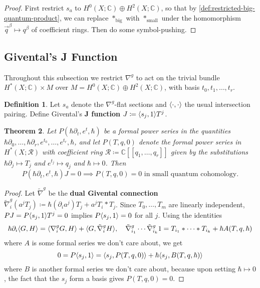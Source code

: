 \documentclass{report}
\theoremstyle{plain}
\newtheorem{theorem}{Theorem}[section]
\theoremstyle{definition}
\newtheorem{definition}[theorem]{Definition}
\theoremstyle{remark}
\newcommand{\di}{\partial}
\newcommand{\bC}{\mathbb{C}}
\newcommand{\cR}{\mathcal{R}}
\DeclarePairedDelimiter{\inner}{\langle}{\rangle}
\begin{document}
\begin{proof}
  First restrict $s_a$ to $H^0(X; \bC) \oplus H^2(X; \bC)$, so that by
  \ref{def:restricted-big-quantum-product}, we can replace
  $*_{\text{big}}$ with $*_{\text{small}}$ under the homomorphism
  $\vec q^\beta \mapsto q^\beta$ of coefficient rings. Then do some
  symbol-pushing.
\end{proof}

\subsection{Givental's J Function}

Throughout this subsection we restrict $\nabla^g$ to act on the
trivial bundle $H^*(X; \bC) \times M$ over $M = H^0(X; \bC) \oplus
H^2(X; \bC)$, with basis $t_0, t_1, \ldots, t_r$.

\begin{definition}
  Let $s_a$ denote the $\nabla^g$-flat sections and $\inner{\cdot,
    \cdot}$ the usual intersection pairing. Define Givental's {\bf J
    function} $J \coloneqq \inner{s_j, 1}T^j$.
\end{definition}

\begin{theorem}
  Let $P(\hbar \di_t, e^t, \hbar)$ be a formal power series in the
  quantities $\hbar \di_0, \ldots, \hbar \di_r, e^{t_0}, \ldots,
  e^{t_r}, \hbar$, and let $P(T,q,0)$ denote the formal power series
  in $H^*(X; \cR)$ with coefficient ring $\cR \coloneqq \bC[[q_1,
      \ldots, q_r]]$ given by the substitutions $\hbar \di_j \mapsto
  T_j$ and $e^{t_j} \mapsto q_j$ and $\hbar \mapsto 0$. Then
  \[ P(\hbar \di_t, e^t, \hbar)J = 0 \implies P(T, q, 0) = 0 \text{ in small quantum cohomology}. \]
\end{theorem}

\begin{proof}
  Let $\tilde\nabla^g$ be the {\bf dual Givental connection}
  $\tilde\nabla^g_i(a^jT_j) \coloneqq \hbar (\di_i a^j)T_j + a^j T_i *
  T_j$. Since $T_0, \ldots, T_m$ are linearly independent, $PJ =
  P\inner{s_j, 1}T^j = 0$ implies $P\inner{s_j, 1} = 0$ for all $j$.
  Using the identities
  \[ \hbar \di_i \inner{G, H} = \inner{\nabla^g_i G, H} + \inner{G, \tilde\nabla^g_i H}, \quad \tilde\nabla^g_{i_1} \cdots \tilde\nabla^g_{i_k}1 = T_{i_1} * \cdots * T_{i_k} + \hbar A(T, q, \hbar) \]
  where $A$ is some formal series we don't care about, we get
  \[ 0 = P\inner{s_j, 1} = \inner{s_j, P(T,q,0)} + \hbar\inner{s_j, B(T, q, \hbar)} \]
  where $B$ is another formal series we don't care about, because upon
  setting $\hbar \mapsto 0$, the fact that the $s_j$ form a basis
  gives $P(T,q,0) = 0$.
\end{proof}
\end{document}
